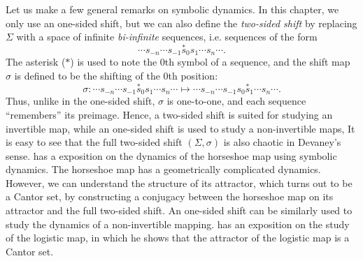 \documentclass[10pt,twoside]{book}
\begin{document}
Let us make a few general remarks on symbolic dynamics.
In this chapter, we only use an one-sided shift, but we can also define the \textit{two-sided shift} by replacing $\Sigma$ with a space of infinite \textit{bi-infinite} sequences, i.e. sequences of the form 
\begin{equation*}
  \cdots s_{-n} \cdots s_{-1} \overset{*}s_0 s_1 \cdots s_n \cdots.
\end{equation*}
The asterisk ($*$) is used to note the 0th symbol of a sequence, and the shift map $\sigma$ is defined to be the shifting of the 0th position:
\begin{equation*}
  \sigma: \cdots s_{-n} \cdots s_{-1} \overset{*}s_0 s_1 \cdots s_n \cdots
  \mapsto
  \cdots s_{-n} \cdots s_{-1} s_0 \overset{*}s_1 \cdots s_n \cdots.
\end{equation*}
Thus, unlike in the one-sided shift, $\sigma$ is one-to-one, and each sequence ``remembers'' its preimage.
Hence, a two-sided shift is suited for studying an invertible map, while an one-sided shift is used to study a non-invertible maps,
It is easy to see that the full two-sided shift $(\Sigma, \sigma)$ is also chaotic in Devaney's sense.
\citet{wiggins} has a exposition on the dynamics of the horseshoe map using symbolic dynamics.
The horseshoe map has a geometrically complicated dynamics.
However, we can understand the structure of its attractor, which turns out to be a Cantor set, by constructing a conjugacy between the horseshoe map on its attractor and the full two-sided shift.
An one-sided shift can be similarly used to study the dynamics of a non-invertible mapping.
\citet{sternberg} has an exposition on the study of the logistic map, in which he shows that the attractor of the logistic map is a Cantor set.
\end{document}

